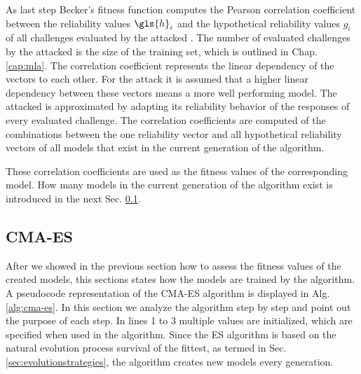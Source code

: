 As last step Becker's fitness function computes the Pearson correlation coefficient between the reliability values $\gls{h}_i$ and the hypothetical reliability values $g_i$ of all challenges evaluated by the attacked \puf.
The number of evaluated challenges by the attacked \puf is the size of the training set, which is outlined in Chap. \ref{cap:mla}.
The correlation coefficient represents the linear dependency of the vectors to each other.
For the attack it is assumed that a higher linear dependency between these vectors means a more well performing model. %
The attacked \puf is approximated by adapting its reliability behavior of the responses of every evaluated challenge.
The correlation coefficients are computed of the combinations between the one reliability vector and all hypothetical reliability vectors of all models that exist in the current generation of the algorithm.

These correlation coefficients are used as the fitness values of the corresponding model.
How many models in the current generation of the algorithm exist is introduced in the next Sec. \ref{sec:cma-esdesign}.


\subsection{CMA-ES}
\label{sec:cma-esdesign}

After we showed in the previous section how to assess the fitness values of the created models, this sections states how the models are trained by the algorithm.
A pseudocode representation of the \ac{CMA-ES} algorithm is displayed in Alg. \ref{alg:cma-es}.
In this section we analyze the algorithm step by step and point out the purpose of each step. %
In lines 1 to 3 multiple values are initialized, which are specified when used in the algorithm.
Since the \ac{ES} algorithm is based on the natural evolution process survival of the fittest, as termed in Sec. \ref{sec:evolutionstrategies}, the algorithm creates new models every generation. %

